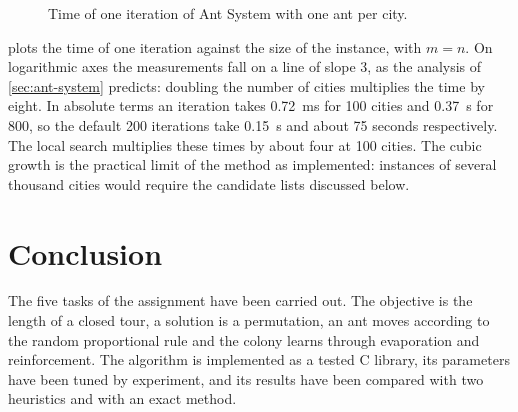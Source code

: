 \documentclass[11pt,a4paper]{article}
\begin{document}
\begin{figure}[htbp]
    \centering
    \caption{Time of one iteration of Ant System with one ant per city.}
    \label{fig:scaling}
\end{figure}

 plots the time of one iteration against the size of the instance, with
$m=n$. On logarithmic axes the measurements fall on a line of slope 3, as the analysis of
\cref{sec:ant-system} predicts: doubling the number of cities multiplies the time by
eight. In absolute terms an iteration takes \SI{0.72}{\milli\second}
for 100 cities and \SI{0.37}{\second} for 800, so the default 200
iterations take \SI{0.15}{\second} and about 75 seconds respectively.
The local search multiplies these times by about four at 100 cities. The cubic growth is
the practical limit of the method as implemented: instances of several thousand cities
would require the candidate lists discussed below.

\section{Conclusion}
\label{sec:conclusion}

The five tasks of the assignment have been carried out. The objective is the length of a
closed tour, a solution is a permutation, an ant moves according to the random proportional
rule and the colony learns through evaporation and reinforcement. The algorithm is
implemented as a tested C library, its parameters have been tuned by experiment, and its
results have been compared with two heuristics and with an exact method.
\end{document}
